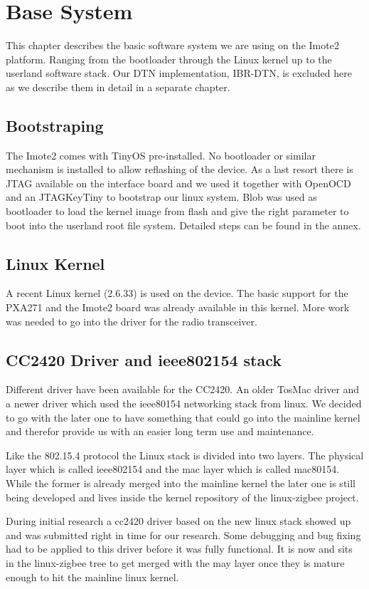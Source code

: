 \chapter{Base System}
This chapter describes the basic software system we are using on the Imote2
platform. Ranging from the bootloader through the Linux kernel up to the
userland software stack. Our DTN implementation, IBR-DTN, is excluded here as we
describe them in detail in a separate chapter.

\section{Bootstraping}
The Imote2 comes with TinyOS pre-installed. No bootloader or similar mechanism
is installed to allow reflashing of the device. As a last resort there is JTAG
available on the interface board and we used it together with OpenOCD and an
JTAGKeyTiny to bootstrap our linux system. Blob was used as bootloader to load
the kernel image from flash and give the right parameter to boot into the
userland root file system. Detailed steps can be found in the annex.

\section{Linux Kernel}
A recent Linux kernel (2.6.33) is used on the device. The basic support for the
PXA271 and the Imote2 board was already available in this kernel. More work was
needed to go into the driver for the radio transceiver.

\section{CC2420 Driver and ieee802154 stack}
Different driver have been available for the CC2420. An older TosMac driver and
a newer driver which used the ieee80154 networking stack from linux. We decided
to go with the later one to have something that could go into the mainline
kernel and therefor provide us with an easier long term use and maintenance.

Like the 802.15.4 protocol the Linux stack is divided into two layers. The
physical layer which is called ieee802154 and the mac layer which is called
mac80154. While the former is already merged into the mainline kernel the later
one is still being developed and lives inside the kernel repository of the
linux-zigbee project.

During initial research a cc2420 driver based on the new linux stack showed up
and was submitted right in time for our research. Some debugging and bug fixing
had to be applied to this driver before it was fully functional. It is now and
sits in the linux-zigbee tree to get merged with the may layer once they is
mature enough to hit the mainline linux kernel.

